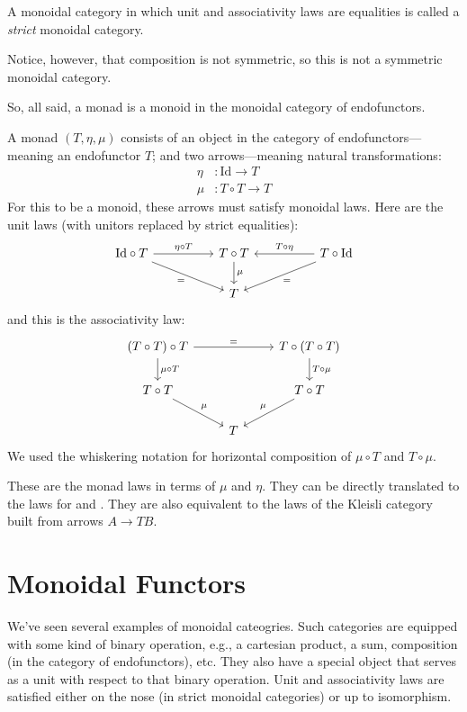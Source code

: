 \documentclass[DaoFP]{subfiles}
\begin{document}
A monoidal category in which unit and associativity laws are equalities is called a \emph{strict} monoidal category.

Notice, however, that composition is not symmetric, so this is not a symmetric monoidal category.

So, all said, a monad is a monoid in the monoidal category of endofunctors. 

A monad $(T, \eta, \mu)$ consists of an object in the category of endofunctors---meaning an endofunctor $T$; and two arrows---meaning natural transformations:
\begin{align*}
 \eta &\colon \text{Id} \to T \\
 \mu &\colon T \circ T \to T 
\end{align*}
For this to be a monoid, these arrows must satisfy monoidal laws. Here are the unit laws (with unitors replaced by strict equalities):
\[
 \begin{tikzcd}
\text{Id} \circ T
 \arrow[rr, "\eta \circ T"]
 \arrow[rrd, "="']
& & T \circ T
 \arrow[d, "\mu"]
&& T \circ \text{Id}
 \arrow[ll, "T \circ \eta"']
 \arrow[lld, "="]
 \\
 && T
  \end{tikzcd}
\]
and this is the associativity law:
\[
 \begin{tikzcd}
 (T \circ T) \circ T 
 \arrow[rr, "="]
 \arrow[d, "\mu \circ T"]
 &&
 T \circ (T \circ T)
 \arrow[d, "T \circ \mu"]
 \\
 T \circ T 
 \arrow[dr, "\mu"]
& & T \circ T
 \arrow[dl, "\mu"']
 \\
&  T
 \end{tikzcd}
\]
We used the whiskering notation for horizontal composition of $\mu \circ T$ and $T \circ \mu$.

These are the monad laws in terms of $\mu$ and $\eta$. They can be directly translated to the laws for  and . They are also equivalent to the laws of the Kleisli category built from arrows $A \to T B$.

\section{Monoidal Functors}

We've seen several examples of monoidal cateogries. Such categories are equipped with some kind of binary operation, e.g., a cartesian product, a sum, composition (in the category of endofunctors), etc. They also have a special object that serves as a unit with respect to that binary operation. Unit and associativity laws are satisfied either on the nose (in strict monoidal categories) or up to isomorphism.
\end{document}
